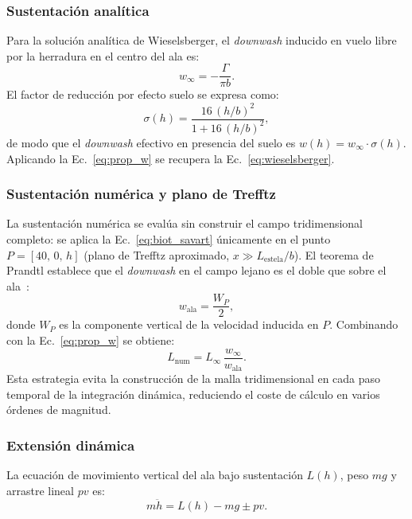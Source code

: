 \documentclass[twocolumn]{article}
\begin{document}
\subsubsection{Sustentación analítica}

Para la solución analítica de Wieselsberger, el \textit{downwash} inducido
en vuelo libre por la herradura en el centro del ala es:
\begin{equation}
  w_\infty = -\frac{\Gamma}{\pi b}.
  \label{eq:winf}
\end{equation}
El factor de reducción por efecto suelo se expresa como:
\begin{equation}
  \sigma(h) = \frac{16\,(h/b)^2}{1 + 16\,(h/b)^2},
  \label{eq:sigma}
\end{equation}
de modo que el \textit{downwash} efectivo en presencia del suelo es
$w(h) = w_\infty \cdot \sigma(h)$. Aplicando la Ec.~\eqref{eq:prop_w}
se recupera la Ec.~\eqref{eq:wieselsberger}.

\subsubsection{Sustentación numérica y plano de Trefftz}

La sustentación numérica se evalúa sin construir el campo tridimensional
completo: se aplica la Ec.~\eqref{eq:biot_savart} únicamente en el punto
$P = [40,\, 0,\, h]$ (plano de Trefftz aproximado, $x \gg L_\text{estela}/b$).
El teorema de Prandtl establece que el \textit{downwash} en el campo lejano
es el doble que sobre el ala~\cite{prandtl1921}:
\begin{equation}
  w_\text{ala} = \frac{W_P}{2},
  \label{eq:trefftz}
\end{equation}
donde $W_P$ es la componente vertical de la velocidad inducida en $P$.
Combinando con la Ec.~\eqref{eq:prop_w} se obtiene:
\begin{equation}
  L_\text{num} = L_\infty \, \frac{w_\infty}{w_\text{ala}}.
  \label{eq:L_num}
\end{equation}
Esta estrategia evita la construcción de la malla tridimensional en cada
paso temporal de la integración dinámica, reduciendo el coste de cálculo
en varios órdenes de magnitud.

\subsubsection{Extensión dinámica}

La ecuación de movimiento vertical del ala bajo sustentación $L(h)$,
peso $mg$ y arrastre lineal $pv$ es:
\begin{equation}
  m\ddot{h} = L(h) - mg \pm pv.
  \label{eq:eom}
\end{equation}
\end{document}
